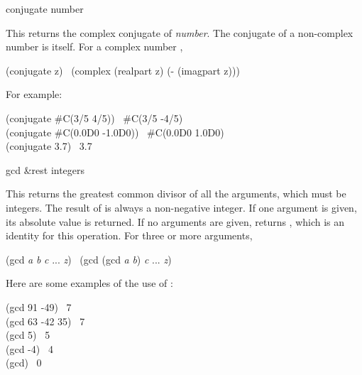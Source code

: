 \begin{defun}[Function]
conjugate number

This returns the complex conjugate of {\it number}.  The conjugate
of a non-complex number is itself.  For a complex number ,
\begin{lisp}
(conjugate z) \EQ\ (complex (realpart z) (- (imagpart z)))
\end{lisp}
For example:
\begin{lisp}
(conjugate \#C(3/5 4/5)) \EV\ \#C(3/5 -4/5) \\
(conjugate \#C(0.0D0 -1.0D0)) \EV\ \#C(0.0D0 1.0D0) \\
(conjugate 3.7) \EV\ 3.7
\end{lisp}
\end{defun}

\begin{defun}[Function]
gcd &rest integers

This returns the greatest common divisor of all the arguments,
which must be integers.  The result of  is always a non-negative
integer.
If one argument is given, its absolute value is returned.
If no arguments are given,  returns ,
which is an identity for this operation.
For three or more arguments,
\begin{lisp}
(gcd {\it a} {\it b} {\it c} ... {\it z}) \EQ\ (gcd (gcd {\it a} {\it b}) {\it c} ... {\it z})
\end{lisp}

Here are some examples of the use of :
\begin{lisp}
(gcd 91 -49) \EV\ 7 \\
(gcd 63 -42 35) \EV\ 7 \\
(gcd 5) \EV\ 5 \\
(gcd -4) \EV\ 4 \\
(gcd) \EV\ 0
\end{lisp}
\end{defun}

